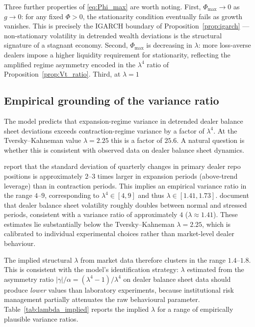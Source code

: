 \documentclass[12pt,a4paper]{article}
\theoremstyle{definition}
\begin{document}
Three further properties of \eqref{eq:Phi_max} are worth noting. First,
$\Phi_{\max} \to 0$ as $g \to 0$: for any fixed $\Phi > 0$, the
stationarity condition eventually fails as growth vanishes. This is precisely
the IGARCH boundary of Proposition~\ref{prop:igarch} --- non-stationary
volatility in detrended wealth deviations is the structural signature of a
stagnant economy. Second, $\Phi_{\max}$ is decreasing in
$\lambda$: more loss-averse dealers impose a higher liquidity requirement
for stationarity, reflecting the amplified regime asymmetry encoded in the
$\lambda^4$ ratio of Proposition~\ref{prop:Vt_ratio}. Third, at $\lambda = 1$

\subsection{Empirical grounding of the variance ratio}
\label{sec:calibration_empirical}

The model predicts that expansion-regime variance in detrended dealer balance
sheet deviations exceeds contraction-regime variance by a factor of $\lambda^4$.
At the Tversky--Kahneman value $\lambda = 2.25$ this is a factor of $25.6$.
A natural question is whether this is consistent with observed data on dealer
balance sheet dynamics.

\citet{adrian2010} report that the standard deviation of quarterly changes in
primary dealer repo positions is approximately $2$--$3$ times larger in
expansion periods (above-trend leverage) than in contraction periods. This
implies an empirical variance ratio in the range $4$--$9$, corresponding to
$\lambda^4 \in [4,9]$ and thus $\lambda \in [1.41, 1.73]$. \citet{brunnermeier2009}
document that dealer balance sheet volatility roughly doubles between normal
and stressed periods, consistent with a variance ratio of approximately $4$
($\lambda \approx 1.41$). These estimates lie substantially below the
Tversky--Kahneman $\lambda = 2.25$, which is calibrated to individual
experimental choices rather than market-level dealer behaviour.

The implied structural $\lambda$ from market data therefore clusters in the
range $1.4$--$1.8$. This is consistent with the model's identification strategy:
$\lambda$ estimated from the asymmetry ratio $|\gamma|/\alpha =
(\lambda^4-1)/\lambda^4$ on dealer balance sheet data should produce
\emph{lower} values than laboratory experiments, because institutional risk
management partially attenuates the raw behavioural parameter. Table~\ref{tab:lambda_implied}
reports the implied $\lambda$ for a range of empirically plausible variance
ratios.
\end{document}
